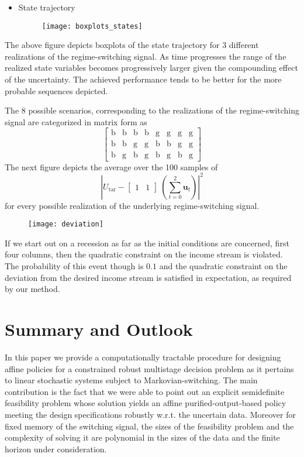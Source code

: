 \documentclass[letterpaper,11pt]{article}
\newcommand{\AR}[2]{\left[\begin{array}{#1}#2\end{array}\right]}
\begin{document}
\begin{itemize}
	\item State trajectory
	\begin{figure}[!h]
		\centering
		\texttt{[image: boxplots\_states]}
	\end{figure} 
\end{itemize}
The above figure depicts boxplots of the state trajectory for 3 different realizations of the regime-switching signal. As  time progresses the range of the realized state variables becomes progressively larger given the compounding effect of the uncertainty.
The achieved performance tends to be better for the more
probable sequences depicted.


The 8 possible scenarios, corresponding to the realizations of the regime-switching signal are categorized in matrix form as
$$
\AR{cccccccc}{ \text{b} & \text{b} & \text{b} & \text{b} & \text{g} & \text{g} & \text{g} & \text{g}  \\ 
	\text{b} & \text{b} & \text{g} & \text{g} & \text{b} & \text{b} & \text{g} & \text{g}  \\ 
	\text{b} & \text{g} & \text{b} & \text{g} & \text{b} & \text{g} & \text{b} & \text{g}  }
$$
The next figure depicts  the average over the 100 samples of 
$$| U_{\text{tar}} - \AR{cc}{1 & 1} ~ (\sum_{t=0}^2 \mathbf{u}_t) |^2$$
for every possible realization of the underlying regime-switching signal. 
\begin{figure}[!h]
	\centering
	\texttt{[image: deviation]}
\end{figure} 
If we start out on a recession  as far as the initial conditions are concerned, first four columns, then the quadratic constraint on the income stream is violated. The probability of this event though is  $ 0.1$
and the quadratic constraint on the deviation from the desired income stream is satisfied in expectation, as required by our method.

\section{Summary and Outlook}

In this paper we provide a computationally tractable procedure for designing affine policies 
for a constrained  robust multistage decision problem as it pertains to linear stochastic systems subject to Markovian-switching.  The main contribution is the fact that we were able to  point out an explicit semidefinite feasibility problem whose solution yields an affine purified-output-based policy meeting the design specifications robustly w.r.t. the uncertain data. Moreover for fixed memory of the switching signal, the sizes of the feasibility problem and the complexity of solving it are polynomial in the sizes of the data and the finite horizon under consideration.
\end{document}
